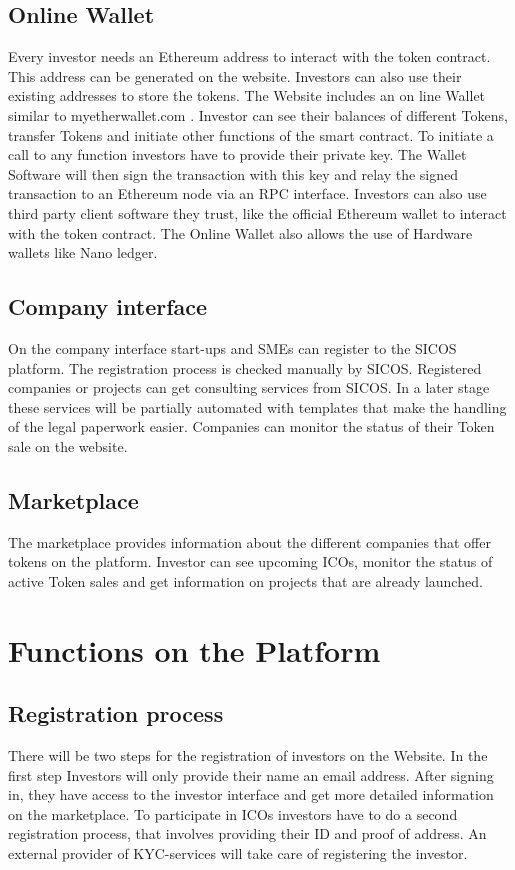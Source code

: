 \documentclass[11pt]{article}
\begin{document}
\subsection{Online Wallet}
Every investor needs an Ethereum address to interact with the token contract. This address can be generated on the website. Investors can also use their existing addresses to store the tokens. 
The Website includes an on line Wallet similar to myetherwallet.com . Investor can see their balances of different Tokens, transfer Tokens and initiate other functions of the smart contract. To initiate a call to any function investors have to provide their private key. The Wallet Software will then sign the transaction with this key and relay the signed transaction to an Ethereum node via an RPC interface. Investors can also use third party client software they trust, like the official Ethereum wallet to interact with the token contract.
The Online Wallet also allows the use of Hardware wallets like Nano ledger.

\subsection{Company interface}
On the company interface start-ups and SMEs can register to the SICOS platform. The registration process is checked manually by SICOS. Registered companies or projects can get consulting services from SICOS. In a later stage these services will be partially automated with templates that make the handling of the legal paperwork easier.
Companies can monitor the status of their Token sale on the website.
\subsection{Marketplace}

The marketplace provides information about the different companies that offer tokens on the platform. Investor can see upcoming ICOs, monitor the status of active Token sales and get information on projects that are already launched.

\section {Functions on the Platform}


\subsection{Registration process}
There will be two steps for the registration of investors on the Website. In the first step Investors will only provide their name an email address. After signing in, they have access to the investor interface and get  more detailed information on the marketplace. To participate in ICOs investors have to do a second registration process, that involves providing their ID and proof of address. An external provider of KYC-services will take care of registering the investor.  
\end{document}
